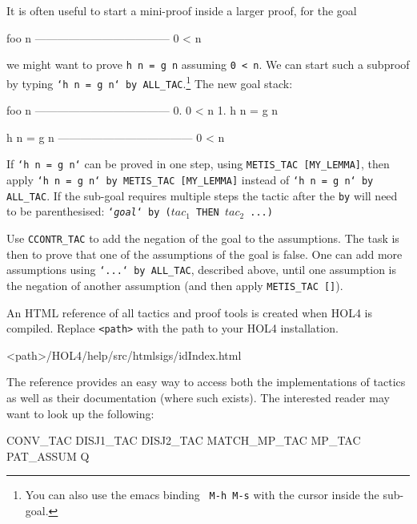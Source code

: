 \documentclass[a4paper,10pt]{article}
\begin{document}

It is often useful to start a mini-proof inside a larger proof, \eg{} for the goal
\begin{code}
    foo n
    ------------------------------------
      0 < n
\end{code}
we might want to prove {\tt\small h n = g n} assuming {\tt\small 0 <
  n}.  We can start such a subproof by typing {\tt\small `h n = g n`
  by ALL\_TAC}.\footnote{You can also use the emacs binding {\tt\small
    M-h M-s} with the cursor inside the sub-goal.} The new goal stack:
\begin{code}
    foo n
    ------------------------------------
      0.  0 < n
      1.  h n = g n

    h n = g n
    ------------------------------------
      0 < n
\end{code}
If {\tt\small `h n = g n`} can be proved in one step, \eg{} using {\tt\small METIS\_TAC [MY\_LEMMA]}, then
apply {\tt\small `h n = g n` by METIS\_TAC [MY\_LEMMA]} instead of
{\tt\small `h n = g n` by ALL\_TAC}.  If the sub-goal requires
multiple steps the tactic after the \texttt{by} will need to be
parenthesised: {\tt\small`\textit{goal}` by ($\mathit{tac}_1$ THEN
  $\mathit{tac}_2$ ...)}


Use {\tt\small CCONTR\_TAC} to add the negation of the goal to the
assumptions.  The task is then to prove that one of the assumptions of
the goal is false. One can \eg{} add more assumptions using
{\tt\small `...` by ALL\_TAC}, described above, until one assumption is the
negation of another assumption (and then apply {\tt\small METIS\_TAC []}).


An HTML reference of all tactics and proof tools is created when HOL4 is compiled.
Replace {\tt\small <path>} with the path to your HOL4 installation.
\begin{code}
<path>/HOL4/help/src/htmlsigs/idIndex.html
\end{code}
The reference provides an easy way to access both the implementations of
tactics as well as their documentation (where such exists).
The interested reader may want to look up the following:
\begin{code}
CONV_TAC  DISJ1_TAC  DISJ2_TAC  MATCH_MP_TAC  MP_TAC  PAT_ASSUM  Q
\end{code}

\end{document}

